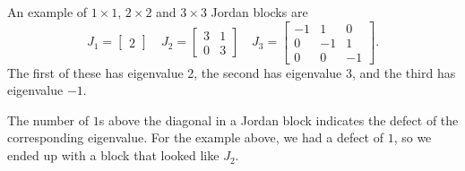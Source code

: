 \documentclass{ximera}
\begin{document}
\begin{example}
    An example of $1\times 1$, $2\times 2$ and $3\times 3$ Jordan blocks are
    \[ 
        J_1 = 
        \begin{bmatrix} 
            2 
        \end{bmatrix} 
        \quad J_2 = 
        \begin{bmatrix} 
            3 & 1 \\ 
            0 & 3 
        \end{bmatrix} 
        \quad J_3 = 
        \begin{bmatrix} 
            -1 & 1 & 0 \\ 
            0 & -1 & 1 \\ 
            0 & 0 & -1 
        \end{bmatrix}. 
    \] 
    The first of these has eigenvalue 2, the second has eigenvalue 3, and the third has eigenvalue $-1$. 
\end{example}

\begin{remark}
    The number of $1$s above the diagonal in a Jordan block indicates the defect of the corresponding eigenvalue. For the example above, we had a defect of $1$, so we ended up with a block that looked like $J_2$. 
\end{remark} 
\end{document}
